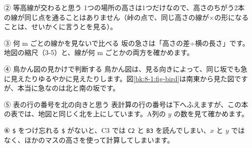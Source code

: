 \begin{tsumazuki}{② 等高線が交わると思う}
1つの場所の高さは1つだけなので、高さのちがう2本の線が同じ点を通ることはありません（峠の点で、同じ高さの線が×の形になることは、せいかくに言うとを見る）。
\end{tsumazuki}

\begin{tsumazuki}{③ 何 m ごとの線かを見ないで比べる}
坂の急さは「高さの差÷横の長さ」です。地図の縮尺（3-5）と、線が何 m ごとかの両方を確かめます。
\end{tsumazuki}

\begin{tsumazuki}{④ 鳥かん図の見かけで判断する}
鳥かん図は、見る向きによって、同じ坂でも急に見えたりゆるやかに見えたりします。図\ref{bk:8-1:fig-bird}は南東から見た図ですが、本当に急なのは北と南の坂です。
\end{tsumazuki}

\begin{tsumazuki}{⑤ 表の行の番号を北の向きと思う}
表計算の行の番号は下へふえますが、この本の表では、地図と同じく北を上にしています。A列の $y$ の数を見て確かめます。
\end{tsumazuki}

\begin{tsumazuki}{⑥ \texttt{\$} をつけ忘れる}
\texttt{\$} がないと、C3 では \texttt{C2} と \texttt{B3} を読んでしまい、$x$ と $y$ ではなく、ほかのマスの高さを使って計算してしまいます。
\end{tsumazuki}

